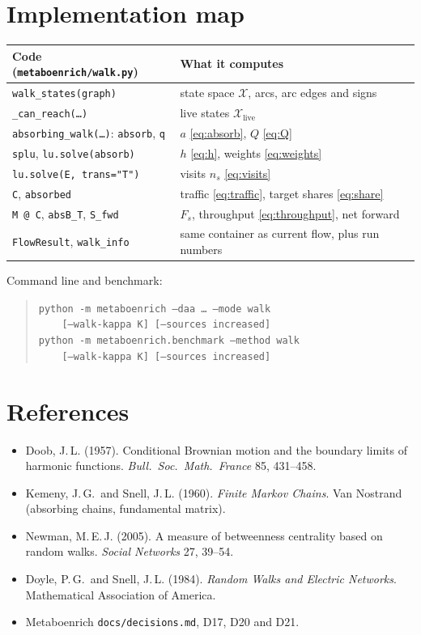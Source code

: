 \documentclass[11pt]{article}
\newcommand{\code}[1]{\texttt{#1}}
\newcommand{\X}{\mathcal{X}}
\begin{document}
\section{Implementation map}
\begin{center}
\small
\begin{tabularx}{\linewidth}{@{}lX@{}}
\toprule
Code (\code{metaboenrich/walk.py}) & What it computes\\
\midrule
\code{walk\_states(graph)} & state space $\X$, arcs, arc edges and signs\\
\code{\_can\_reach(\dots)} & live states $\X_{\mathrm{live}}$\\
\code{absorbing\_walk(\dots)}: \code{absorb}, \code{q} & $a$ \eqref{eq:absorb}, $Q$ \eqref{eq:Q}\\
\quad \code{splu}, \code{lu.solve(absorb)} & $h$ \eqref{eq:h}, weights \eqref{eq:weights}\\
\quad \code{lu.solve(E, trans="T")} & visits $n_s$ \eqref{eq:visits}\\
\quad \code{C}, \code{absorbed} & traffic \eqref{eq:traffic}, target shares \eqref{eq:share}\\
\quad \code{M @ C}, \code{absB\_T}, \code{S\_fwd} & $F_s$, throughput \eqref{eq:throughput}, net forward\\
\code{FlowResult}, \code{walk\_info} & same container as current flow, plus run numbers\\
\bottomrule
\end{tabularx}
\end{center}
\noindent Command line and benchmark:
\begin{quote}\small
\code{python -m metaboenrich --daa \dots{} --mode walk}\\
\code{\ \ \ \ [--walk-kappa K] [--sources increased]}\\
\code{python -m metaboenrich.benchmark --method walk}\\
\code{\ \ \ \ [--walk-kappa K] [--sources increased]}
\end{quote}

\section*{References}
\begin{itemize}[nosep,leftmargin=*]
  \item Doob, J.\,L. (1957). Conditional Brownian motion and the boundary limits of
        harmonic functions. \emph{Bull.\ Soc.\ Math.\ France} 85, 431--458.
  \item Kemeny, J.\,G.\ and Snell, J.\,L. (1960). \emph{Finite Markov Chains}.
        Van Nostrand (absorbing chains, fundamental matrix).
  \item Newman, M.\,E.\,J. (2005). A measure of betweenness centrality based on random
        walks. \emph{Social Networks} 27, 39--54.
  \item Doyle, P.\,G.\ and Snell, J.\,L. (1984). \emph{Random Walks and Electric
        Networks}. Mathematical Association of America.
  \item Metaboenrich \code{docs/decisions.md}, D17, D20 and D21.
\end{itemize}
\end{document}
